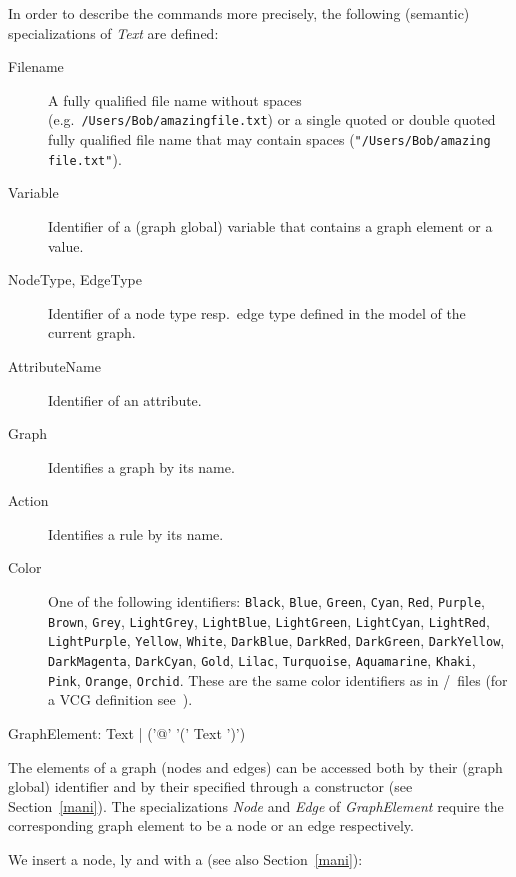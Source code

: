 In order to describe the commands more precisely, the following (semantic) specializations of \emph{Text} are defined:
\begin{description}
  \item[Filename]A fully qualified file name without spaces (e.g.\ \texttt{/Users/Bob/amazing\textunderscore file.txt}) or a single quoted or double quoted fully qualified file name that may contain spaces (\texttt{"/Users/Bob/amazing file.txt"}).
  \item[Variable] Identifier of a (graph global) variable that contains a graph element or a value. 
  \item[NodeType, EdgeType] Identifier of a node type resp.\ edge type defined in the model of the current graph.
  \item[AttributeName] Identifier of an attribute.
  \item[Graph] Identifies a graph by its name.
  \item[Action] Identifies a rule by its name.
  \item[Color] One of the following  identifiers: \texttt{Black}, \texttt{Blue}, \texttt{Green}, \texttt{Cyan}, \texttt{Red}, \texttt{Purple}, \texttt{Brown}, \texttt{Grey}, \texttt{LightGrey}, \texttt{LightBlue}, \texttt{LightGreen}, \texttt{LightCyan}, \texttt{LightRed}, \texttt{LightPurple}, \texttt{Yel\-low}, \texttt{White}, \texttt{DarkBlue}, \texttt{DarkRed}, \texttt{DarkGreen}, \texttt{DarkYellow}, \texttt{DarkMagenta}, \texttt{DarkCyan}, \texttt{Gold}, \texttt{Lilac}, \texttt{Turquoise}, \texttt{Aquamarine}, \texttt{Khaki}, \texttt{Pink}, \texttt{Orange}, \texttt{Orchid}. These are the same color identifiers as in /\yComp\ files (for a VCG definition see~\cite{vcg}).
\end{description}
\makeatletter
\begin{rail}
  GraphElement: Text | ('@' '(' Text ')')
\end{rail}
\makeatother
The elements of a graph (nodes and edges) can be accessed both by their (graph global)  identifier and by their  specified through a constructor (see Section~\ref{mani}).
The specializations \emph{Node} and \emph{Edge} of \emph{GraphElement} require the corresponding graph element to be a node or an edge respectively.
\begin{example}
\label{persistentex} 
We insert a node, ly and with a  (see also Section~\ref{mani}):
\end{example}
